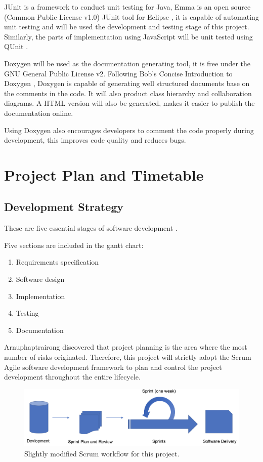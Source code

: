 \documentclass[11pt,a4paper]{article}
\begin{document}
JUnit is a framework to conduct unit testing for Java, Emma is an open source (Common Public License v1.0) JUnit tool for Eclipse \parencite{Roubtsov2010}, it is capable of automating unit testing and will be used the development and testing stage of this project. Similarly, the parts of implementation using JavaScript will be unit tested using QUnit \parencite{qunit}.

Doxygen \parencite{Doxygen} will be used as the documentation generating tool, it is free under the GNU General Public License v2. Following Bob's Concise Introduction to Doxygen \parencite{Laramee2011}, Doxygen is capable of generating well structured documents base on the comments in the code. It will also product class hierarchy and collaboration diagrams. A HTML version will also be generated, makes it easier to publish the documentation online.

Using Doxygen also encourages developers to comment the code properly during development, this improves code quality and reduces bugs.

\section{Project Plan and Timetable}
\label{sec4}
\subsection{Development Strategy}
\label{Development Strategy}

These are five essential stages of software development \parencite[p .11]{Laramee2011a, Vliet2007}.

Five sections are included in the gantt chart:
\begin{enumerate}
	\item Requirements specification
	\item Software design
	\item Implementation
	\item Testing
	\item Documentation
\end{enumerate}

Arnuphaptrairong \parencite{Arnuphaptrairong2011} discovered that project planning is the area where the most number of risks originated. Therefore, this project will strictly adopt the Scrum Agile software development framework to plan and control the project development throughout the entire lifecycle.

\begin{figure}[H]
	\centering
	\includegraphics[width=\textwidth,keepaspectratio]{figures/fig15.png}
	\caption{\label{fig:15}Slightly modified Scrum workflow for this project. }
\end{figure}
\end{document}
